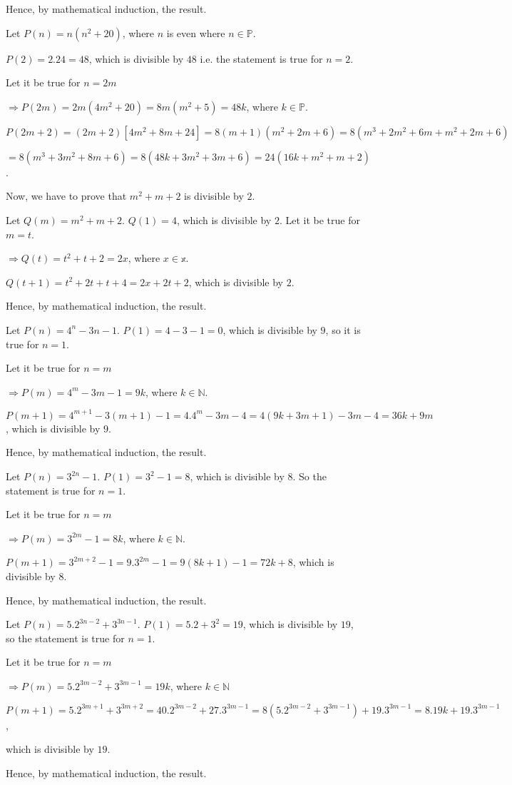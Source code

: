   Hence, by mathematical induction, the result.
\item Let $P(n) = n(n^2 + 20)$, where $n$ is even where $n\in\mathbb{P}$.

  $P(2) = 2.24 = 48$, which is divisible by $48$ i.e. the statement is true for $n = 2$.

  Let it be true for $n = 2m$

  $\Rightarrow P(2m) = 2m(4m^2 + 20) = 8m(m^2 + 5) = 48k$, where $k\in\mathbb{P}$.

  $P(2m + 2) = (2m + 2)\left[4m^2 + 8m + 24\right] = 8(m + 1)(m^2 + 2m + 6) = 8(m^3 + 2m^2 + 6m + m^2 + 2m +
  6)$

  $= 8(m^3 + 3m^2 + 8m + 6) = 8(48k + 3m^2 + 3m + 6) = 24(16k + m^2 + m + 2)$.

  Now, we have to prove that $m^2 + m + 2$ is divisible by $2$.

  Let $Q(m) = m^2 + m + 2$. $Q(1) = 4$, which is divisible by $2$. Let it be true for $m = t$.

  $\Rightarrow Q(t) = t^2 + t + 2 = 2x$, where $x\in\mathbb{x}$.

  $Q(t + 1) = t^2 + 2t + t + 4 = 2x + 2t + 2$, which is divisible by $2$.

  Hence, by mathematical induction, the result.
\item Let $P(n) = 4^n - 3n - 1$. $P(1) = 4 - 3 - 1 = 0$, which is divisible by $9$, so it is true for $n =
  1$.

  Let it be true for $n = m$

  $\Rightarrow P(m) = 4^m - 3m - 1 = 9k$, where $k\in\mathbb{N}$.

  $P(m + 1) = 4^{m + 1} - 3(m + 1) - 1 = 4.4^m - 3m - 4 = 4(9k + 3m + 1) -3m  - 4 = 36k + 9m$, which is
  divisible by $9$.

  Hence, by mathematical induction, the result.
\item Let $P(n) = 3^{2n} - 1$. $P(1) = 3^2 - 1 = 8$, which is divisible by $8$. So the statement is true for
  $n = 1$.

  Let it be true for $n = m$

  $\Rightarrow P(m) = 3^{2m} - 1 = 8k$, where $k\in\mathbb{N}$.

  $P(m + 1) = 3^{2m + 2} - 1 = 9.3^{2m} - 1 = 9(8k + 1) - 1 = 72k + 8$, which is divisible by $8$.

  Hence, by mathematical induction, the result.
\item Let $P(n) = 5.2^{3n - 2} + 3^{3n - 1}$. $P(1) = 5.2 + 3^2 = 19$, which is divisible by $19$, so the
  statement is true for $n = 1$.

  Let it be true for $n = m$

  $\Rightarrow P(m) = 5.2^{3m - 2} + 3^{3m - 1} = 19k$, where $k\in\mathbb{N}$

  $P(m + 1) = 5.2^{3m + 1} + 3^{3m + 2} = 40.2^{3m - 2} + 27.3^{3m - 1} = 8(5.2^{3m - 2} + 3^{3m - 1}) +
  19.3^{3m - 1} = 8.19k + 19.3^{3m - 1}$,

  which is divisible by $19$.

  Hence, by mathematical induction, the result.
\stopitemize